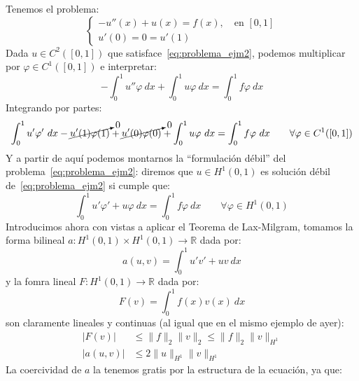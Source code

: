 \begin{ejemplo}
    Tenemos el problema:
    \begin{equation}\label{eq:problema_ejm2}
        \left\{\begin{array}{l}
                -u''(x) + u(x) = f(x), \quad \text{en\ } [0,1] \\
                u'(0) = 0 = u'(1)
        \end{array}\right.
    \end{equation}
    Dada $u\in C^2([0,1])$ que satisface~\eqref{eq:problema_ejm2}, podemos multiplicar por $\varphi \in C^1([0,1])$ e interpretar:
    \begin{equation*}
        -\int_{0}^{1} u''\varphi~dx  + \int_{0}^{1} u\varphi~dx  = \int_{0}^{1} f\varphi~dx 
    \end{equation*}
    Integrando por partes:
    \begin{equation*}
        \int_{0}^{1} u'\varphi'~dx -\cancelto{0}{u'(1)\varphi(1)} + \cancelto{0}{u'(0)\varphi(0)} + \int_{0}^{1} u\varphi~dx  = \int_{0}^{1} f\varphi~dx  \qquad \forall \varphi \in C^1([0,1])
    \end{equation*}
    Y a partir de aquí podemos montarnos la ``formulación débil'' del problema~\eqref{eq:problema_ejm2}: diremos que $u\in H^1(0,1)$ es solución débil de~\eqref{eq:problema_ejm2} si cumple que:
    \begin{equation*}
        \int_{0}^{1} u'\varphi'+u\varphi~dx  = \int_{0}^{1} f\varphi~dx  \qquad \forall \varphi \in H^1(0,1)
    \end{equation*}
    Introducimos ahora con vistas a aplicar el Teorema de Lax-Milgram, tomamos la forma bilineal $a:H^1(0,1)\times H^1(0,1)\to\mathbb{R}$ dada por:
    \begin{equation*}
        a(u,v)=\int_{0}^{1} u'v'+uv~dx 
    \end{equation*}
    y la fomra lineal $F:H^1(0,1)\to\mathbb{R}$ dada por:
    \begin{equation*}
        F(v) = \int_{0}^{1} f(x)v(x)~dx 
    \end{equation*}
    son claramente lineales y continuas (al igual que en el mismo ejemplo de ayer):
    \begin{align*}
        |F(v)| &\leq \|f\|_2 \|v\|_2 \leq \|f\|_2 \|v\|_{H^1} \\
        |a(u,v)| &\leq 2\|u\|_{H^1}\|v\|_{H^1}
    \end{align*}
    La coercividad de $a$ la tenemos gratis por la estructura de la ecuación, ya que:
    \begin{equation*}

\end{equation*}
\end{ejemplo}
